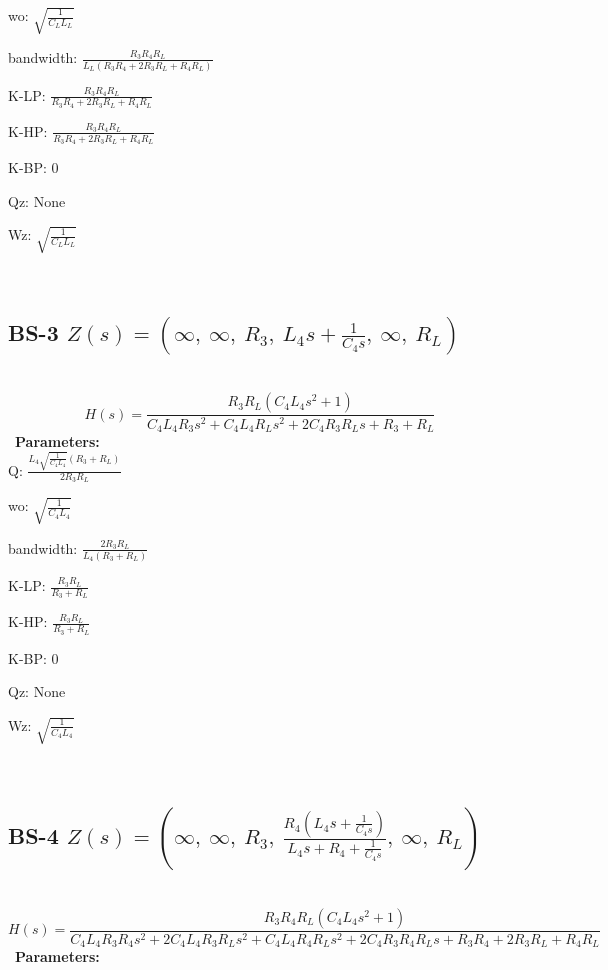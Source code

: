 \documentclass{article}
\begin{document}
wo: $\sqrt{\frac{1}{C_{L} L_{L}}}$\ 

bandwidth: $\frac{R_{3} R_{4} R_{L}}{L_{L} \left(R_{3} R_{4} + 2 R_{3} R_{L} + R_{4} R_{L}\right)}$\ 

K-LP: $\frac{R_{3} R_{4} R_{L}}{R_{3} R_{4} + 2 R_{3} R_{L} + R_{4} R_{L}}$\ 

K-HP: $\frac{R_{3} R_{4} R_{L}}{R_{3} R_{4} + 2 R_{3} R_{L} + R_{4} R_{L}}$\ 

K-BP: $0$\ 

Qz: $\text{None}$\ 

Wz: $\sqrt{\frac{1}{C_{L} L_{L}}}$\ 

\ 

\subsection{BS-3 $Z(s) = \left( \infty, \  \infty, \  R_{3}, \  L_{4} s + \frac{1}{C_{4} s}, \  \infty, \  R_{L}\right)$ } \ 
\textbf{\[H(s) = \frac{R_{3} R_{L} \left(C_{4} L_{4} s^{2} + 1\right)}{C_{4} L_{4} R_{3} s^{2} + C_{4} L_{4} R_{L} s^{2} + 2 C_{4} R_{3} R_{L} s + R_{3} + R_{L}}\] } \ 
\textbf{Parameters:}\\ 

Q: $\frac{L_{4} \sqrt{\frac{1}{C_{4} L_{4}}} \left(R_{3} + R_{L}\right)}{2 R_{3} R_{L}}$\ 

wo: $\sqrt{\frac{1}{C_{4} L_{4}}}$\ 

bandwidth: $\frac{2 R_{3} R_{L}}{L_{4} \left(R_{3} + R_{L}\right)}$\ 

K-LP: $\frac{R_{3} R_{L}}{R_{3} + R_{L}}$\ 

K-HP: $\frac{R_{3} R_{L}}{R_{3} + R_{L}}$\ 

K-BP: $0$\ 

Qz: $\text{None}$\ 

Wz: $\sqrt{\frac{1}{C_{4} L_{4}}}$\ 

\ 

\subsection{BS-4 $Z(s) = \left( \infty, \  \infty, \  R_{3}, \  \frac{R_{4} \left(L_{4} s + \frac{1}{C_{4} s}\right)}{L_{4} s + R_{4} + \frac{1}{C_{4} s}}, \  \infty, \  R_{L}\right)$ } \ 
\textbf{\[H(s) = \frac{R_{3} R_{4} R_{L} \left(C_{4} L_{4} s^{2} + 1\right)}{C_{4} L_{4} R_{3} R_{4} s^{2} + 2 C_{4} L_{4} R_{3} R_{L} s^{2} + C_{4} L_{4} R_{4} R_{L} s^{2} + 2 C_{4} R_{3} R_{4} R_{L} s + R_{3} R_{4} + 2 R_{3} R_{L} + R_{4} R_{L}}\] } \ 
\textbf{Parameters:}\\ 
\end{document}
